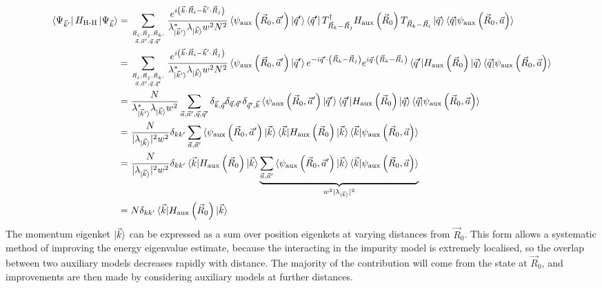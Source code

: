 \documentclass{report}
\numberwithin{equation}{section}
\begin{document}
\begin{equation}\begin{aligned}
	\bra{\Psi_{\vec k^\prime}}H_\text{H-H} \ket{\Psi_{\vec k}} &= \sum_{\vec R_i, \vec R_j, \vec R_k, \atop{\vec a, \vec a^\prime, \vec q, \vec q^\prime}}\frac{e^{i\left(\vec{k}\cdot\vec{R}_i - \vec{k}^\prime\cdot\vec{R}_j\right)}}{\lambda^*_{\ket{\vec k^\prime}} \lambda_{\ket{\vec k}} w^2 N^2} \braket{\psi_\text{aux}\left(\vec R_0, \vec a^\prime\right)| \vec q^\prime}\bra{\vec q^\prime} T^\dagger_{\vec R_k - \vec R_j} H_\text{aux}\left(\vec R_0\right) T_{\vec R_k - \vec R_i}  \ket{\vec q}\braket{\vec q | \psi_\text{aux}\left(\vec R_0, \vec a\right)}\\
								   &= \sum_{\vec R_i, \vec R_j, \vec R_k, \atop{\vec a, \vec a^\prime, \vec q, \vec q^\prime}}\frac{e^{i\left(\vec{k}\cdot\vec{R}_i - \vec{k}^\prime\cdot\vec{R}_j\right)}}{\lambda^*_{\ket{\vec k^\prime}} \lambda_{\ket{\vec k}} w^2 N^2} \braket{\psi_\text{aux}\left(\vec R_0, \vec a^\prime\right)| \vec q^\prime} e^{-i \vec q^\prime \cdot \left(\vec R_k - \vec R_j\right) } e^{i \vec q \cdot \left(\vec R_k - \vec R_i\right)} \braket{\vec q^\prime | H_\text{aux}\left(\vec R_0\right) | \vec q}  \braket{\vec q | \psi_\text{aux}\left(\vec R_0, \vec a\right)}\\
								   &= \frac{N}{\lambda^*_{\ket{\vec k^\prime}} \lambda_{\ket{\vec k}} w^2}\sum_{\vec a, \vec a^\prime, \vec q, \vec q^\prime} \delta_{\vec k, \vec q} \delta_{\vec q,\vec q^\prime} \delta_{\vec q^\prime,\vec k} \braket{\psi_\text{aux}\left(\vec R_0, \vec a^\prime\right)| \vec q^\prime} \braket{\vec q^\prime | H_\text{aux}\left(\vec R_0\right) | \vec q}  \braket{\vec q | \psi_\text{aux}\left(\vec R_0, \vec a\right)}\\
								   &= \frac{N}{|\lambda_{\ket{\vec k}}|^2 w^2}\delta_{kk^\prime}\sum_{\vec a, \vec a^\prime} \braket{\psi_\text{aux}\left(\vec R_0, \vec a^\prime\right)| \vec k} \braket{\vec k | H_\text{aux}\left(\vec R_0\right) | \vec k}  \braket{\vec k | \psi_\text{aux}\left(\vec R_0, \vec a\right)}\\
								   &= \frac{N}{|\lambda_{\ket{\vec k}}|^2 w^2}\delta_{kk^\prime}\braket{\vec k | H_\text{aux}\left(\vec R_0\right) | \vec k} \underbrace{\sum_{\vec a, \vec a^\prime} \braket{\psi_\text{aux}\left(\vec R_0, \vec a^\prime\right)| \vec k} \braket{\vec k | \psi_\text{aux}\left(\vec R_0, \vec a\right)}}_{w^2 |\lambda_{\ket{\vec k}}|^2}\\
	&= N\delta_{kk^\prime}\braket{\vec k | H_\text{aux}\left(\vec R_0\right) | \vec k}
\end{aligned}\end{equation}
The momentum eigenket \(\ket{\vec k}\) can be expressed as a sum over position eigenkets at varying distances from \(\vec R_0\). This form allows a systematic method of improving the energy eigenvalue estimate, because the interacting in the impurity model is extremely localised, so the overlap between two auxiliary models decreases rapidly with distance. The majority of the contribution will come from the state at \(\vec R_0\), and improvements are then made by considering auxiliary models at further distances. 
\end{document}
